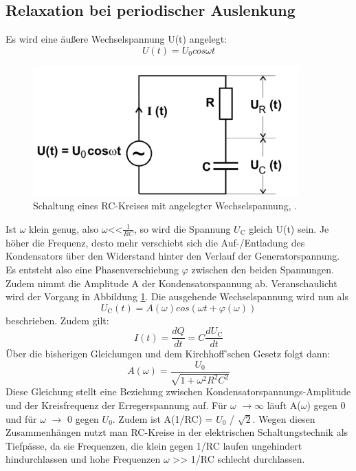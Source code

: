 \subsection{Relaxation bei periodischer Auslenkung}
Es wird eine äußere Wechselspannung U(t) angelegt:
\begin{equation*}
	U(t) = U_0 cos\omega t
\end{equation*}
\begin{figure}[h]
  \centering
  \includegraphics[height=5cm]{Grafiken/Wechsel.pdf}
  \caption{Schaltung eines RC-Kreises mit angelegter Wechselspannung, \cite{1}.}
  \label{fig:Wechsel}
\end{figure}
Ist $\omega$ klein genug, also $\omega$<<$\frac{1}{RC}$, so wird die Spannung $U_\text{C}$ gleich U(t) sein. Je höher die Frequenz, desto mehr verschiebt sich die Auf-/Entladung des Kondensators über den Widerstand hinter den Verlauf der Generatorspannung. Es entsteht also eine Phasenverschiebung $\varphi$ zwischen den beiden Spannungen. Zudem nimmt die Amplitude A der Kondensatorspannung ab. Veranschaulicht wird der Vorgang in Abbildung \ref{fig:Wechsel}.
Die ausgehende Wechselspannung wird nun als 
\begin{equation}
	U_\text{C}(t) = A(\omega)cos(\omega t + \varphi(\omega))
\end{equation}
beschrieben.
Zudem gilt:
\begin{equation}
	I(t) = \frac{dQ}{dt} = C \frac{dU_\text{C}}{dt}
\end{equation}
Über die bisherigen Gleichungen und dem Kirchhoff'schen Gesetz folgt dann:
\begin{equation}
	A(\omega) = \frac{U_0}{\sqrt{1+\omega^2 R^2 C^2}}
\end{equation}
Diese Gleichung stellt eine Beziehung zwischen Kondensatorspannungs-Amplitude und der Kreisfrequenz der Erregerspannung auf. Für $\omega$ $\rightarrow \infty$ läuft A($\omega$) gegen 0 und für $\omega$ $\rightarrow$ 0 gegen $U_0$. Zudem ist A(1/RC) = $U_0$ / $\sqrt{2}$. 
Wegen diesen Zusammenhängen nutzt man RC-Kreise in der elektrischen Schaltungstechnik als Tiefpässe, da sie Frequenzen, die klein gegen 1/RC laufen ungehindert hindurchlassen und hohe Frequenzen $\omega$ >> 1/RC schlecht durchlassen. 

